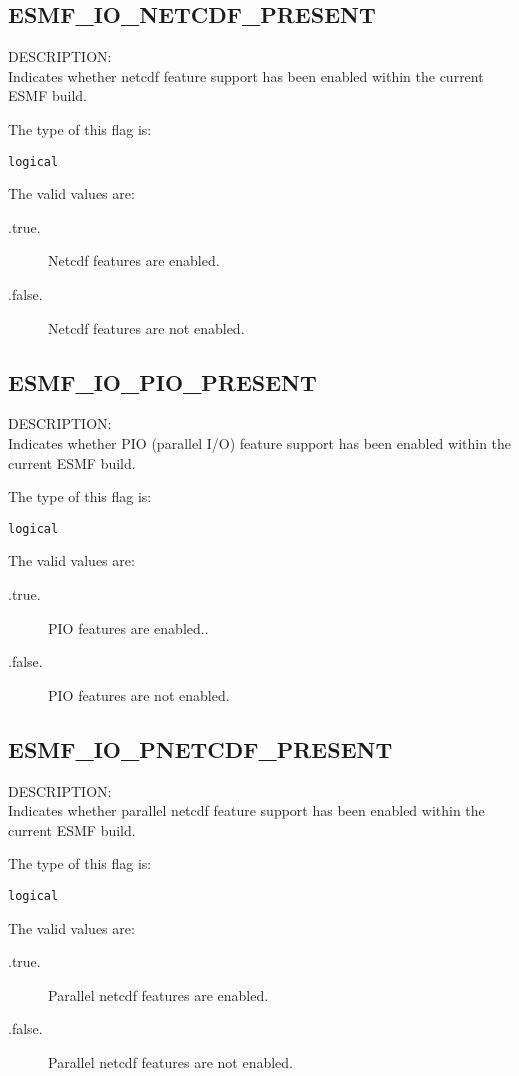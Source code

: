 \subsection{ESMF\_IO\_NETCDF\_PRESENT}
\label{const:ionetcdfflag}
{\sf DESCRIPTION:\\}
Indicates whether netcdf feature support has been enabled
within the current ESMF build.

The type of this flag is:

{\tt logical}

The valid values are:
\begin{description}
\item [.true.]
      Netcdf features are enabled.
\item [.false.]
      Netcdf features are not enabled.
\end{description}

\subsection{ESMF\_IO\_PIO\_PRESENT}
\label{const:iopioflag}
{\sf DESCRIPTION:\\}
Indicates whether PIO (parallel I/O) feature support has been enabled
within the current ESMF build.

The type of this flag is:

{\tt logical}

The valid values are:
\begin{description}
 \item [.true.]
      PIO features are enabled..
\item [.false.]
      PIO  features are not enabled.
\end{description}

\subsection{ESMF\_IO\_PNETCDF\_PRESENT}
\label{const:iopnetcdfflag}
{\sf DESCRIPTION:\\}
Indicates whether parallel netcdf feature support has been enabled
within the current ESMF build.

The type of this flag is:

{\tt logical}

The valid values are:
\begin{description}
\item [.true.]
      Parallel netcdf features are enabled.
\item [.false.]
      Parallel netcdf features are not enabled.
\end{description}


